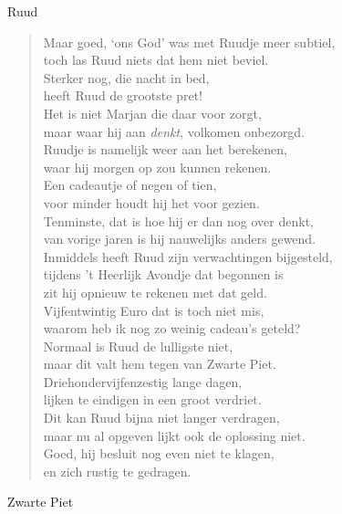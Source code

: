 \documentclass[12pt]{brief}
\begin{document}
\begin{letter}{Ruud}
\begin{verse}
Maar goed, `ons God' was met Ruudje meer subtiel,\\
toch las Ruud niets dat hem niet beviel.\\
Sterker nog, die nacht in bed,\\
heeft Ruud de grootste pret!\\
Het is niet Marjan die daar voor zorgt,\\
maar waar hij aan \emph{denkt}, volkomen onbezorgd.\\
Ruudje is namelijk weer aan het berekenen,\\
waar hij morgen op zou kunnen rekenen.\\
Een cadeautje of negen of tien,\\
voor minder houdt hij het voor gezien.\\
Tenminste, dat is hoe hij er dan nog over denkt,\\
van vorige jaren is hij nauwelijks anders gewend.\\[0.5em]

Inmiddels heeft Ruud zijn verwachtingen bijgesteld,\\
tijdens 't Heerlijk Avondje dat begonnen is\\
zit hij opnieuw te rekenen met dat geld.\\
Vijfentwintig Euro dat is toch niet mis,\\
waarom heb ik nog zo weinig cadeau's geteld?\\[0.5em]

Normaal is Ruud de lulligste niet,\\
maar dit valt hem tegen van Zwarte Piet.\\
Driehondervijfenzestig lange dagen,\\
lijken te eindigen in een groot verdriet.\\
Dit kan Ruud bijna niet langer verdragen,\\
maar nu al opgeven lijkt ook de oplossing niet.\\
Goed, hij besluit nog even niet te klagen,\\
en zich rustig te gedragen.\\[2em]

\end{verse}


Zwarte Piet


\closing{}

\end{letter}
\end{document}
